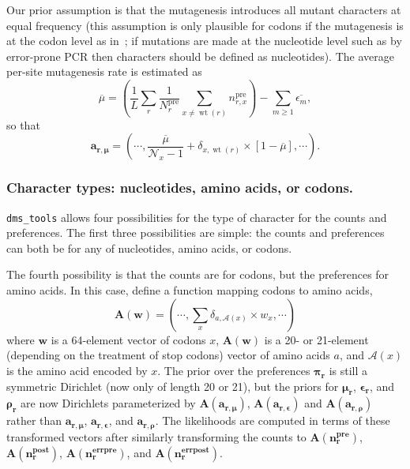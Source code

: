 \documentclass[twocolumn]{bmcart}%
\begin{document}
Our prior assumption is that the mutagenesis introduces all mutant characters at equal frequency (this assumption is only plausible for codons if the mutagenesis is at the codon level as in~\cite{firnberg2012,jain2013rapid,firnberg2014comprehensive,bloom2014experimentally,melnikov2014comprehensive,kitzman2015massively}; if mutations are made at the nucleotide level such as by error-prone PCR then characters should be defined as nucleotides). The average per-site mutagenesis rate is estimated as
\begin{equation}
\label{eq:avgmu}
\overline{\mu} = \left(\frac{1}{L}\sum\limits_r \frac{1}{N_r^{\textrm{pre}}}\sum\limits_{x\ne \operatorname{wt}\left(r\right)} n_{r,x}^{\textrm{pre}}\right) - \sum\limits_{m \ge 1} \overline{\epsilon_m},
\end{equation}
so that
\begin{equation}
\boldsymbol{\mathbf{a_{r,\mu}}} = \left(\cdots, \frac{\overline{\mu}}{\mathcal{N}_x - 1} + \delta_{x,\operatorname{wt}\left(r\right)} \times \left[1 - \overline{\mu}\right] ,\cdots\right). \label{eq:armu}
\end{equation}

\subsubsection*{Character types: nucleotides, amino acids, or codons.}
\texttt{dms\_tools} allows four possibilities for the type of character for the counts and preferences. The first three possibilities are simple: the counts and preferences can both be for any of nucleotides, amino acids, or codons. 

The fourth possibility is that the counts are for codons, but the preferences for amino acids. In this case, define a function mapping codons to amino acids, 
\begin{equation}
\label{eq:A}
\mathbf{A}\left(\mathbf{w}\right) = \left(\cdots, \sum\limits_x \delta_{a,\mathcal{A}\left(x\right)} \times w_x, \cdots\right)
\end{equation}
where $\mathbf{w}$ is a 64-element vector of codons $x$, $\mathbf{A}\left(\mathbf{w}\right)$ is a 20- or 21-element (depending on the treatment of stop codons) vector of amino acids $a$, and $\mathcal{A}\left(x\right)$ is the amino acid encoded by $x$. The prior over the preferences $\boldsymbol{\mathbf{\pi_r}}$ is still a symmetric Dirichlet (now only of length 20 or 21), but the priors for $\boldsymbol{\mathbf{\mu_r}}$, $\boldsymbol{\mathbf{\epsilon_r}}$, and $\boldsymbol{\mathbf{\rho_r}}$ are now Dirichlets parameterized by $\mathbf{A}\left(\boldsymbol{\mathbf{a_{r,\mu}}}\right)$, $\mathbf{A}\left(\boldsymbol{\mathbf{a_{r,\epsilon}}}\right)$ and $\mathbf{A}\left(\boldsymbol{\mathbf{a_{r,\rho}}}\right)$ rather than $\boldsymbol{\mathbf{a_{r,\mu}}}$, $\boldsymbol{\mathbf{a_{r,\epsilon}}}$, and $\boldsymbol{\mathbf{a_{r,\rho}}}$. The likelihoods are computed in terms of these transformed vectors after similarly transforming the counts to $\mathbf{A}\left(\mathbf{n_r^{\textbf{pre}}}\right)$, $\mathbf{A}\left(\mathbf{n_r^{\textbf{post}}}\right)$, $\mathbf{A}\left(\mathbf{n_r^{\textbf{errpre}}}\right)$, and $\mathbf{A}\left(\mathbf{n_r^{\textbf{errpost}}}\right)$.
\end{document}
